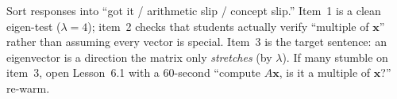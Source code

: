 \documentclass[10pt]{article}
\newcommand{\xx}{\mathbf{x}}
\begin{document}
\begin{teachernote}
Sort responses into ``got it / arithmetic slip / concept slip.'' Item~1 is a clean eigen-test
($\lambda=4$); item~2 checks that students actually verify ``multiple of $\xx$'' rather than assuming
every vector is special. Item~3 is the target sentence: an eigenvector is a direction the matrix only
\emph{stretches} (by $\lambda$). If many stumble on item~3, open Lesson~6.1 with a 60-second
``compute $A\xx$, is it a multiple of $\xx$?'' re-warm.
\end{teachernote}
\end{document}
